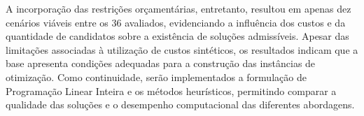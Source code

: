 \documentclass[12pt,a4paper]{article}
\begin{document}
A incorporação das restrições orçamentárias, entretanto, resultou em apenas dez cenários viáveis entre os 36 avaliados, evidenciando a influência dos custos e da quantidade de candidatos sobre a existência de soluções admissíveis. Apesar das limitações associadas à utilização de custos sintéticos, os resultados indicam que a base apresenta condições adequadas para a construção das instâncias de otimização. Como continuidade, serão implementados a formulação de Programação Linear Inteira e os métodos heurísticos, permitindo comparar a qualidade das soluções e o desempenho computacional das diferentes abordagens.

\printbibliography[title={Referências}]
\end{document}
